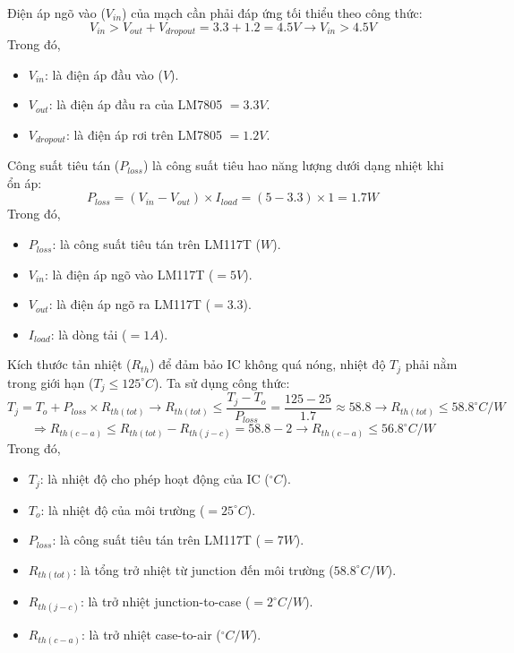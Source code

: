 Điện áp ngõ vào ($V_{in}$) của mạch cần phải đáp ứng tối thiểu theo công thức: \[ V_{in} > V_{out} + V_{dropout} = 3.3 + 1.2 = 4.5V \rightarrow V_{in} > 4.5V\]
Trong đó,
\begin{itemize}[label = -]
	\item $V_{in}$: là điện áp đầu vào ($V$).
	\item $V_{out}$: là điện áp đầu ra của LM7805 $=3.3V$.
	\item $V_{dropout}$: là điện áp rơi trên LM7805 $=1.2V$.
\end{itemize}

Công suất tiêu tán ($P_{loss}$) là công suất tiêu hao năng lượng dưới dạng nhiệt khi ổn áp: \[ P_{loss} = (V_{in} - V_{out}) \times I_{load} = (5 - 3.3)\times 1 = 1.7W\]
Trong đó,
\begin{itemize}[label=-]
	\item $P_{loss}$: là công suất tiêu tán trên LM117T ($W$).
	\item $V_{in}$: là điện áp ngõ vào LM117T ($=5V$).
	\item $V_{out}$: là điện áp ngõ ra LM117T ($=3.3$).
	\item $I_{load}$: là dòng tải ($=1A$).
\end{itemize}

Kích thước tản nhiệt ($R_{th}$) để đảm bảo IC không quá nóng, nhiệt độ $T_j$ phải nằm trong giới hạn ($T_j \leq 125^{\circ}C$). Ta sử dụng công thức: \[ T_{j} = T_{o} + P_{loss} \times R_{th(tot)} \rightarrow R_{th(tot)} \leq \dfrac{T_{j} - T_{o}}{P_{loss}} = \dfrac{125 - 25}{1.7} \approx 58.8 \rightarrow R_{th(tot)} \leq 58.8^{\circ}C/W
\]
\[ \Rightarrow R_{th(c-a)} \leq R_{th(tot)} - R_{th(j-c)} = 58.8 - 2 \rightarrow R_{th(c-a)} \leq 56.8^{\circ}C/W \]
Trong đó,
\begin{itemize}[label = -]
	\item $T_{j}$: là nhiệt độ cho phép hoạt động của IC ($ ^\circ C$).
	\item $T_{o}$: là nhiệt độ của môi trường ($=25^{\circ}C$).
	\item $P_{loss}$: là công suất tiêu tán trên LM117T ($=7W$).
	\item $R_{th(tot)}$: là tổng trở nhiệt từ junction đến môi trường ($58.8^{\circ}C/W$).
	\item $R_{th(j-c)}$: là trở nhiệt junction-to-case ($=2^{\circ}C/W$).
	\item $R_{th(c-a)}$: là trở nhiệt case-to-air ($^{\circ}C/W$).
\end{itemize}


